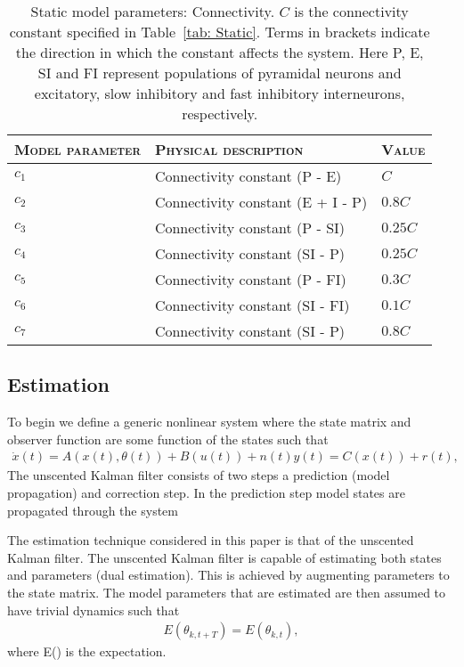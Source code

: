 \begin{center}
	\begin{table}
			\caption[Static Model Parameters: Connectivity]{Static model parameters: Connectivity. $C$ is the connectivity constant specified in Table~\ref{tab: Static}. Terms in brackets indicate the direction in which the constant affects the system. Here P, E, SI and FI represent populations of pyramidal neurons and excitatory, slow inhibitory and fast inhibitory interneurons, respectively.}
		\begin{tabular}{||p{4cm}|p{7cm}|p{2cm}||}\hline
			 \textsc{Model parameter}  & \textsc{Physical description} & \textsc{Value}
			   \\\hline\hline
			 $c_{1}$ & Connectivity constant (P - E) & $C$ \\\hline
			 $c_{2}$ & Connectivity constant (E + I - P) & $0.8C$ \\\hline
			 $c_{3}$ & Connectivity constant (P - SI) & $0.25C$  \\\hline
			 $c_{4}$ & Connectivity constant (SI - P)& $0.25C$ \\\hline
			 $c_{5}$ & Connectivity constant (P - FI) & $0.3C$ \\\hline
			 $c_{6}$ & Connectivity constant (SI - FI) & $0.1C$ \\\hline
			 $c_{7}$ & Connectivity constant (SI - P) & $0.8C$ \\\hline\hline
		\end{tabular}
		\label{tab: Connectivity}
	\end{table}
\end{center}

\subsection{Estimation}

To begin we define a generic nonlinear system where the state matrix and observer function are some function of the states such that \begin{align}
\dot{x}(t) = A(x(t),\theta(t)) + B(u(t)) + n(t)
y(t)  = C(x(t)) +r(t),
\end{align}
The unscented Kalman filter consists of two steps a prediction (model propagation) and correction step. In the prediction step model states are propagated through the system

The estimation technique considered in this paper is that of the unscented Kalman filter. The unscented Kalman filter is capable of estimating both states and parameters (dual estimation). This is achieved by augmenting parameters to the state matrix. The model parameters that are estimated are then assumed to have trivial dynamics such that \begin{align}
E(\theta_{k,t+T}) = E(\theta_{k,t}),
\end{align} where E(\cdot) is the expectation.


